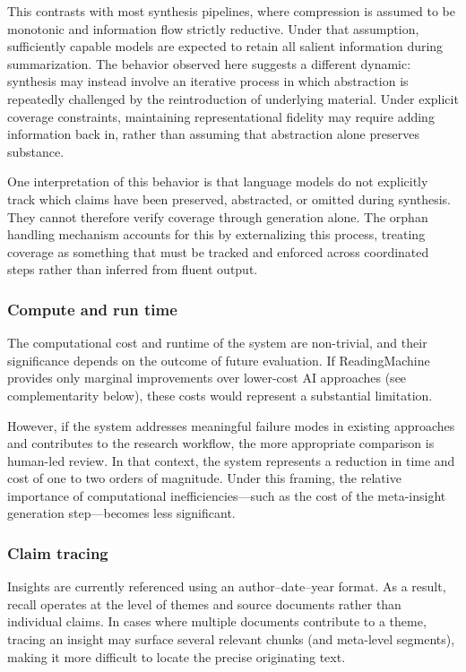 \documentclass[
  11pt,
]{article}
\begin{document}
This contrasts with most synthesis pipelines, where compression is
assumed to be monotonic and information flow strictly reductive. Under
that assumption, sufficiently capable models are expected to retain all
salient information during summarization. The behavior observed here
suggests a different dynamic: synthesis may instead involve an iterative
process in which abstraction is repeatedly challenged by the
reintroduction of underlying material. Under explicit coverage
constraints, maintaining representational fidelity may require adding
information back in, rather than assuming that abstraction alone
preserves substance.

One interpretation of this behavior is that language models do not
explicitly track which claims have been preserved, abstracted, or
omitted during synthesis. They cannot therefore verify coverage through
generation alone. The orphan handling mechanism accounts for this by
externalizing this process, treating coverage as something that must be
tracked and enforced across coordinated steps rather than inferred from
fluent output.

\subsubsection{Compute and run time}\label{compute-and-run-time}

The computational cost and runtime of the system are non-trivial, and
their significance depends on the outcome of future evaluation. If
ReadingMachine provides only marginal improvements over lower-cost AI
approaches (see complementarity below), these costs would represent a
substantial limitation.

However, if the system addresses meaningful failure modes in existing
approaches and contributes to the research workflow, the more
appropriate comparison is human-led review. In that context, the system
represents a reduction in time and cost of one to two orders of
magnitude. Under this framing, the relative importance of computational
inefficiencies---such as the cost of the meta-insight generation
step---becomes less significant.

\subsubsection{Claim tracing}\label{claim-tracing}

Insights are currently referenced using an author--date--year format. As
a result, recall operates at the level of themes and source documents
rather than individual claims. In cases where multiple documents
contribute to a theme, tracing an insight may surface several relevant
chunks (and meta-level segments), making it more difficult to locate the
precise originating text.
\end{document}
